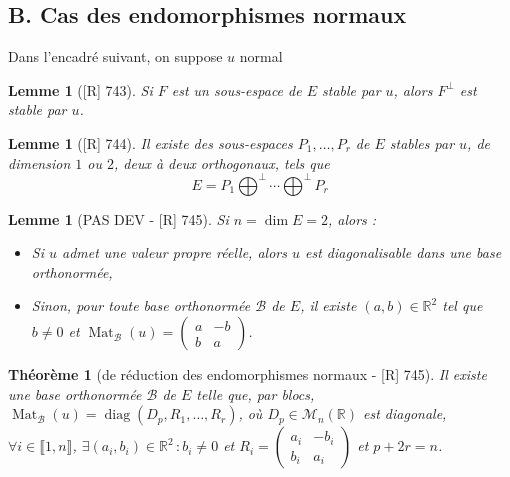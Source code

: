 \documentclass[10pt, a4paper, parskip=full, twoside, twocolumn]{report}
\newtheorem{theorem}[definition]{Théorème}
\newtheorem{lemma}[definition]{Lemme}
\newcommand{\IR}{\mathbb{R}}
\newcommand{\M}{\mathcal{M}}
\DeclareMathOperator{\Mat}{Mat}
\DeclareMathOperator{\diag}{diag}
\begin{document}
\subsection*{B. Cas des endomorphismes normaux}
\textcolor{paragraphtext}{Dans l'encadré suivant, on suppose $u$ normal}


\begin{tcolorbox}[
    breakable, %
    colback=developpement, %
    colframe=gray!0!black, %
    boxrule=0pt, %
    arc=1mm, %
	boxsep=0pt,
	left=0pt, right=0pt, top=0pt, bottom=0pt
]
\begin{lemma}[\textnormal{[R] 743}]
	\label{151dev12}
	Si $F$ est un sous-espace de $E$ stable par $u$, alors $F^{\perp}$ est stable par $u$.
\end{lemma}
\begin{lemma}[\textnormal{[R] 744}]
	\label{151dev13}
	Il existe des sous-espaces $P_1,\dots, P_r$ de $E$ stables par $u$, de dimension $1$ ou $2$, deux à deux orthogonaux, tels que 
	$$E = P_1\bigoplus^{\perp}\cdots\bigoplus^{\perp} P_r$$
\end{lemma}
\end{tcolorbox}

\begin{lemma}[PAS DEV - \textnormal{[R] 745}]
	Si $n = \dim E = 2$, alors :
	\begin{itemize}
		\item Si $u$ admet une valeur propre réelle, alors $u$ est diagonalisable dans une base orthonormée,
		\item Sinon, pour toute base orthonormée $\mathcal{B}$ de $E$, il existe $(a,b)\in\IR^2$ tel que $b\neq 0$ et $\Mat_{\mathcal{B}}(u)=\begin{pmatrix}
			a & -b \\ b & a
		\end{pmatrix}$.
	\end{itemize}
\end{lemma}

\begin{tcolorbox}[
    breakable, %
    colback=developpement, %
    colframe=gray!0!black, %
    boxrule=0pt, %
    arc=1mm, %
	boxsep=0pt,
	left=0pt, right=0pt, top=0pt, bottom=0pt
]
\begin{theorem}[de réduction des endomorphismes normaux - \textnormal{[R] 745}]
	Il existe une base orthonormée $\mathcal{B}$ de $E$ telle que, par blocs, $\Mat_{\mathcal{B}}(u) = \diag(D_p, R_1,\dots, R_r)$, où 
	$D_p\in\M_n(\IR)$ est diagonale, $\forall i\in \llbracket 1,n\rrbracket$, $\exists (a_i, b_i)\in\IR^2\,\colon b_i \neq 0$ et $R_i = \begin{pmatrix}
		a_i & -b_i \\ b_i & a_i
	\end{pmatrix}$ et $p+2r = n$.
\end{theorem}
\end{tcolorbox}
\end{document}
